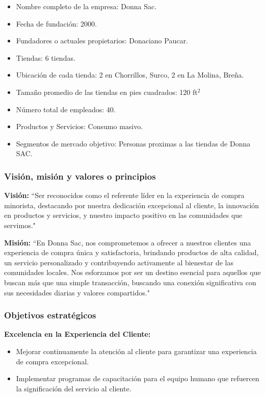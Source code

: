 \begin{itemize}
		\item Nombre completo de la empresa: Donna Sac.
		\item Fecha de fundación: 2000.
		\item Fundadores o actuales propietarios: Donaciano Paucar. 
		\item Tiendas: 6 tiendas.
		\item Ubicación de cada tienda: 2 en Chorrillos, Surco, 2 en La Molina, Breña.
		\item Tamaño promedio de las tiendas en pies cuadrados: 120 ft$^2$
		\item Número total de empleados: 40.
		\item Productos y Servicios: Consumo masivo.
		\item Segmentos de mercado objetivo: Personas proximas a las tiendas de Donna SAC.
\end{itemize}

\subsubsection{Visión, misión y valores o principios}
\textbf{Visión:} ``Ser reconocidos como el referente líder en la experiencia de compra minorista, destacando por nuestra dedicación excepcional al cliente, la innovación en productos y servicios, y nuestro impacto positivo en las comunidades que servimos."
\newline

\textbf{Misión:} ``En Donna Sac, nos comprometemos a ofrecer a nuestros clientes una experiencia de compra única y satisfactoria, brindando productos de alta calidad, un servicio personalizado y contribuyendo activamente al bienestar de las comunidades locales. Nos esforzamos por ser un destino esencial para aquellos que buscan más que una simple transacción, buscando una conexión significativa con sus necesidades diarias y valores compartidos."

\subsubsection{Objetivos estratégicos}
\textbf{Excelencia en la Experiencia del Cliente:}
\begin{itemize}
	\item Mejorar continuamente la atención al cliente para garantizar una experiencia de compra excepcional.
	\item Implementar programas de capacitación para el equipo humano que refuercen la significación del servicio al cliente.
\end{itemize}

